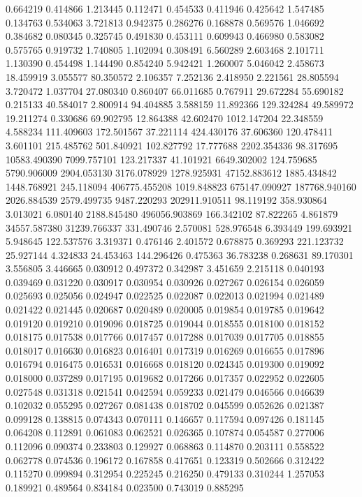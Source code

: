0.664219
0.414866
1.213445
0.112471
0.454533
0.411946
0.425642
1.547485
0.134763
0.534063
3.721813
0.942375
0.286276
0.168878
0.569576
1.046692
0.384682
0.080345
0.325745
0.491830
0.453111
0.609943
0.466980
0.583082
0.575765
0.919732
1.740805
1.102094
0.308491
6.560289
2.603468
2.101711
1.130390
0.454498
1.144490
0.854240
5.942421
1.260007
5.046042
2.458673
18.459919
3.055577
80.350572
2.106357
7.252136
2.418950
2.221561
28.805594
3.720472
1.037704
27.080340
0.860407
66.011685
0.767911
29.672284
55.690182
0.215133
40.584017
2.800914
94.404885
3.588159
11.892366
129.324284
49.589972
19.211274
0.330686
69.902795
12.864388
42.602470
1012.147204
22.348559
4.588234
111.409603
172.501567
37.221114
424.430176
37.606360
120.478411
3.601101
215.485762
501.840921
102.827792
17.777688
2202.354336
98.317695
10583.490390
7099.757101
123.217337
41.101921
6649.302002
124.759685
5790.906009
2904.053130
3176.078929
1278.925931
47152.883612
1885.434842
1448.768921
245.118094
406775.455208
1019.848823
675147.090927
187768.940160
2026.884539
2579.499735
9487.220293
202911.910511
98.119192
358.930864
3.013021
6.080140
2188.845480
496056.903869
166.342102
87.822265
4.861879
34557.587380
31239.766337
331.490746
2.570081
528.976548
6.393449
199.693921
5.948645
122.537576
3.319371
0.476146
2.401572
0.678875
0.369293
221.123732
25.927144
4.324833
24.453463
144.296426
0.475363
36.783238
0.268631
89.170301
3.556805
3.446665
0.030912
0.497372
0.342987
3.451659
2.215118
0.040193
0.039469
0.031220
0.030917
0.030954
0.030926
0.027267
0.026154
0.026059
0.025693
0.025056
0.024947
0.022525
0.022087
0.022013
0.021994
0.021489
0.021422
0.021445
0.020687
0.020489
0.020005
0.019854
0.019785
0.019642
0.019120
0.019210
0.019096
0.018725
0.019044
0.018555
0.018100
0.018152
0.018175
0.017538
0.017766
0.017457
0.017288
0.017039
0.017705
0.018855
0.018017
0.016630
0.016823
0.016401
0.017319
0.016269
0.016655
0.017896
0.016794
0.016475
0.016531
0.016668
0.018120
0.024345
0.019300
0.019092
0.018000
0.037289
0.017195
0.019682
0.017266
0.017357
0.022952
0.022605
0.027548
0.031318
0.021541
0.042594
0.059233
0.021479
0.046566
0.046639
0.102032
0.055295
0.027267
0.081438
0.018702
0.045599
0.052626
0.021387
0.099128
0.138815
0.074343
0.070111
0.146657
0.117594
0.097426
0.181145
0.064208
0.112891
0.061083
0.062521
0.026365
0.107874
0.054587
0.277006
0.112096
0.090374
0.233803
0.129927
0.068863
0.114870
0.203111
0.558522
0.062778
0.074536
0.196172
0.167858
0.417651
0.123319
0.502666
0.312422
0.115270
0.099894
0.312954
0.225245
0.216250
0.479133
0.310244
1.257053
0.189921
0.489564
0.834184
0.023500
0.743019
0.885295
